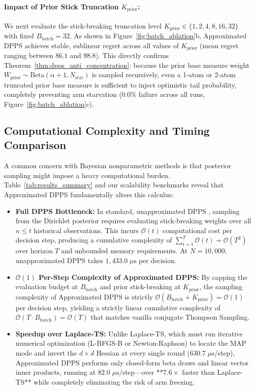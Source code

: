 \documentclass[twoside]{article}
\begin{document}
\paragraph{Impact of Prior Stick Truncation $K_{\text{prior}}$:} We next evaluate the stick-breaking truncation level $K_{\text{prior}} \in \{1, 2, 4, 8, 16, 32\}$ with fixed $B_{\text{batch}} = 32$. As shown in Figure~\ref{fig:batch_ablation}b, Approximated DPPS achieves stable, sublinear regret across all values of $K_{\text{prior}}$ (mean regret ranging between $86.1$ and $98.8$). This directly confirms Theorem~\ref{thm:dpps_anti_concentration}: because the prior base measure weight $W_{\text{prior}} \sim \text{Beta}(\alpha + 1, N_{\text{stat}})$ is sampled recursively, even a 1-atom or 2-atom truncated prior base measure is sufficient to inject optimistic tail probability, completely preventing arm starvation ($0.0\%$ failure across all runs, Figure~\ref{fig:batch_ablation}c).

\subsection{Computational Complexity and Timing Comparison}

A common concern with Bayesian nonparametric methods is that posterior sampling might impose a heavy computational burden. Table~\ref{tab:results_summary} and our scalability benchmarks reveal that Approximated DPPS fundamentally alters this calculus:
\begin{itemize}
    \item \textbf{Full DPPS Bottleneck:} In standard, unapproximated DPPS \citep{vashishtha2025leveraging}, sampling from the Dirichlet posterior requires evaluating stick-breaking weights over all $n \le t$ historical observations. This incurs $\mathcal{O}(t)$ computational cost per decision step, producing a cumulative complexity of $\sum_{t=1}^T \mathcal{O}(t) = \mathcal{O}(T^2)$ over horizon $T$ and unbounded memory requirements. At $N = 10{,}000$, unapproximated DPPS takes $1{,}433.0 \; \mu\text{s}$ per decision.
    \item \textbf{$\mathcal{O}(1)$ Per-Step Complexity of Approximated DPPS:} By capping the evaluation budget at $B_{\text{batch}}$ and prior stick-breaking at $K_{\text{prior}}$, the sampling complexity of Approximated DPPS is strictly $\mathcal{O}(B_{\text{batch}} + K_{\text{prior}}) = \mathcal{O}(1)$ per decision step, yielding a strictly linear cumulative complexity of $\mathcal{O}(T \cdot B_{\text{batch}}) = \mathcal{O}(T)$ that matches vanilla conjugate Thompson Sampling.
    \item \textbf{Speedup over Laplace-TS:} Unlike Laplace-TS, which must run iterative numerical optimization (L-BFGS-B or Newton-Raphson) to locate the MAP mode and invert the $d \times d$ Hessian at every single round ($630.7 \; \mu\text{s}$/step), Approximated DPPS performs only closed-form beta draws and linear vector inner products, running at $82.0 \; \mu\text{s}$/step—over **$7.6\times$ faster than Laplace-TS** while completely eliminating the risk of arm freezing.
\end{itemize}
\end{document}
